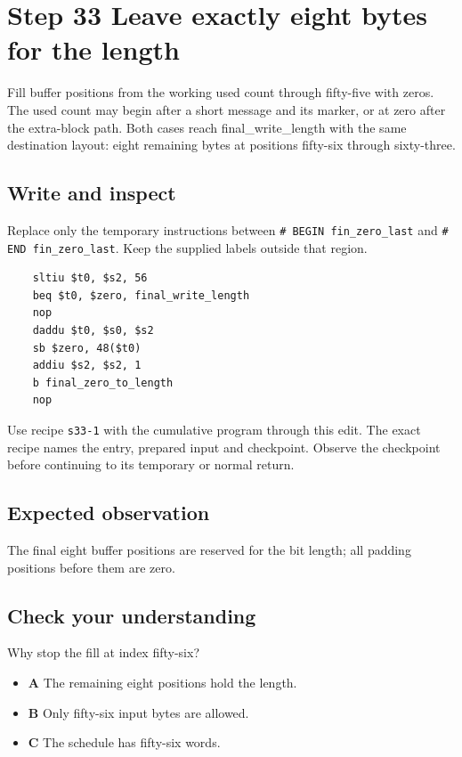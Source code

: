 \section{Step 33 Leave exactly eight bytes for the length}\label{sha-s33}

Fill buffer positions from the working used count through fifty-five with zeros. The used count may begin after a short message and its marker, or at zero after the extra-block path. Both cases reach final\_write\_length with the same destination layout: eight remaining bytes at positions fifty-six through sixty-three.

\subsection{Write and inspect}
Replace only the temporary instructions between \texttt{\# BEGIN fin\_zero\_last} and \texttt{\# END fin\_zero\_last}. Keep the supplied labels outside that region.

\begin{verbatim}
    sltiu $t0, $s2, 56
    beq $t0, $zero, final_write_length
    nop
    daddu $t0, $s0, $s2
    sb $zero, 48($t0)
    addiu $s2, $s2, 1
    b final_zero_to_length
    nop
\end{verbatim}

Use recipe \texttt{s33-1} with the cumulative program through this edit. The exact recipe names the entry, prepared input and checkpoint. Observe the checkpoint before continuing to its temporary or normal return.

\subsection{Expected observation}
The final eight buffer positions are reserved for the bit length; all padding positions before them are zero.

\subsection{Check your understanding}
Why stop the fill at index fifty-six?

\begin{itemize}
\item \textbf{A} The remaining eight positions hold the length.
\item \textbf{B} Only fifty-six input bytes are allowed.
\item \textbf{C} The schedule has fifty-six words.
\end{itemize}
